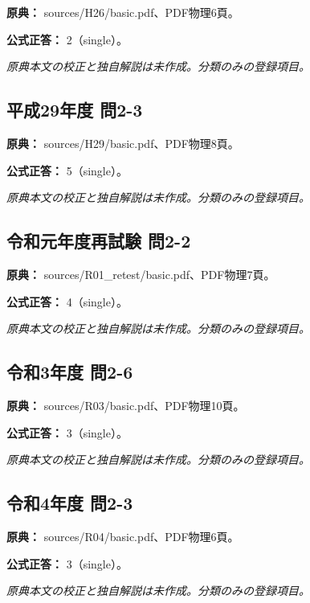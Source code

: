 \noindent\textbf{原典：} sources/H26/basic.pdf、PDF物理6頁。

\textbf{公式正答：} 2（single）。

\par\textit{原典本文の校正と独自解説は未作成。分類のみの登録項目。}

\subsection{平成29年度 問2-3}
\label{q:h29-reg-basic-2-3}

\noindent\textbf{原典：} sources/H29/basic.pdf、PDF物理8頁。

\textbf{公式正答：} 5（single）。

\par\textit{原典本文の校正と独自解説は未作成。分類のみの登録項目。}

\subsection{令和元年度再試験 問2-2}
\label{q:r01-ret-basic-2-2}

\noindent\textbf{原典：} sources/R01\_retest/basic.pdf、PDF物理7頁。

\textbf{公式正答：} 4（single）。

\par\textit{原典本文の校正と独自解説は未作成。分類のみの登録項目。}

\subsection{令和3年度 問2-6}
\label{q:r03-reg-basic-2-6}

\noindent\textbf{原典：} sources/R03/basic.pdf、PDF物理10頁。

\textbf{公式正答：} 3（single）。

\par\textit{原典本文の校正と独自解説は未作成。分類のみの登録項目。}

\subsection{令和4年度 問2-3}
\label{q:r04-reg-basic-2-3}

\noindent\textbf{原典：} sources/R04/basic.pdf、PDF物理6頁。

\textbf{公式正答：} 3（single）。

\par\textit{原典本文の校正と独自解説は未作成。分類のみの登録項目。}

